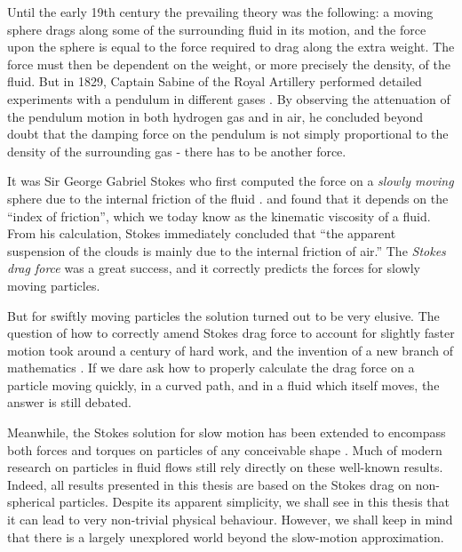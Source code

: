 \documentclass[thesis.tex]{subfiles}
\begin{document}
Until the early 19th century the prevailing theory was the following: a moving sphere drags along some of the surrounding fluid in its motion, and the force upon the sphere is equal to the force required to drag along the extra weight. The force must then be dependent on the weight, or more precisely the density, of the fluid. But in 1829, Captain Sabine of the Royal Artillery performed detailed experiments with a pendulum in different gases \cite{sabine1829}. By observing the attenuation of the pendulum motion in both hydrogen gas and in air, he concluded beyond doubt that the damping force on the pendulum is not simply proportional to the density of the surrounding gas - there has to be another force.

It was Sir George Gabriel Stokes who first computed the force on a \emph{slowly moving
} sphere due to the internal friction of the fluid \cite{stokes1851}. and found that it depends on the ``index of friction'', which we today know as the kinematic viscosity of a fluid. From his calculation, Stokes immediately concluded that ``the apparent suspension of the clouds is mainly due to the internal friction of air.'' 
The \emph{Stokes drag force} was a great success, and it correctly predicts the forces for slowly moving particles.

But for swiftly moving particles
the solution turned out to be very elusive. The question of how to correctly amend Stokes drag force to account for slightly faster motion took around a century of hard work, and the invention of a new branch of mathematics \cite{veysey2007}. If we dare ask how to properly calculate the drag force on a particle moving quickly, in a curved path, and in a fluid which itself moves, the answer is still debated.

Meanwhile, the Stokes solution for slow motion has been extended to encompass both forces and torques on particles of any conceivable shape \cite{jeffery1922,brenner1974,kim1991}. Much of modern research on particles in fluid flows still rely directly on these well-known results. Indeed, all results presented in this thesis are based on the Stokes drag on non-spherical particles. Despite its apparent simplicity, we shall see in this thesis that it can lead to very non-trivial physical behaviour. However, we shall keep in mind that there is a largely unexplored world beyond the slow-motion approximation.
\end{document}
